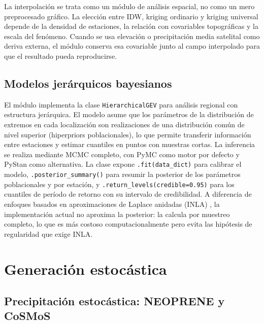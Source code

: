 La interpolación se trata como un módulo de análisis espacial, no como un mero preprocesado gráfico. La elección entre IDW, kriging ordinario y kriging universal depende de la densidad de estaciones, la relación con covariables topográficas y la escala del fenómeno. Cuando se usa elevación o precipitación media satelital como deriva externa, el módulo conserva esa covariable junto al campo interpolado para que el resultado pueda reproducirse.

\subsection{Modelos jerárquicos bayesianos}

El módulo  implementa la clase \texttt{HierarchicalGEV} para análisis regional con estructura jerárquica. El modelo asume que los parámetros de la distribución de extremos en cada localización son realizaciones de una distribución común de nivel superior (hiperpriors poblacionales), lo que permite transferir información entre estaciones y estimar cuantiles en puntos con muestras cortas. La inferencia se realiza mediante MCMC completo, con PyMC como motor por defecto y PyStan \parencite{carpenter2017stan} como alternativa. La clase expone \texttt{.fit(data\_dict)} para calibrar el modelo, \texttt{.posterior\_summary()} para resumir la posterior de los parámetros poblacionales y por estación, y \texttt{.return\_levels(credible=0.95)} para los cuantiles de período de retorno con su intervalo de credibilidad. A diferencia de enfoques basados en aproximaciones de Laplace anidadas (INLA) \parencite{rue2009inla}, la implementación actual no aproxima la posterior: la calcula por muestreo completo, lo que es más costoso computacionalmente pero evita las hipótesis de regularidad que exige INLA.

\section{Generación estocástica}

\subsection{Precipitación estocástica: NEOPRENE y CoSMoS}

